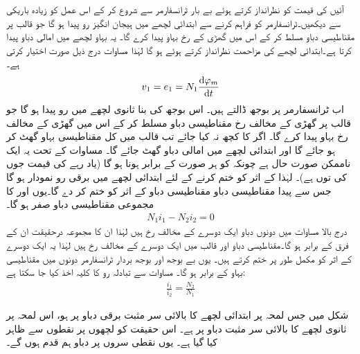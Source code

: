 آئیں  کی قیمت کو نظرانداز کرتے ہوئے بے بار ٹرانسفارمر سے شروع کر کے اس عمل کو زیادہ باریکی سے دیکھیں۔ٹرانسفارمر کو  فراہم کرنے سے ابتدائی لچھے میں ہیجان انگیز رو  پیدا ہو گا جو قالب پر  مقناطیسی دباو مسلط  کر کے اس میں گھڑی کے رخ بہاو  پیدا کرے گا۔ یہ بہاو  لچھے میں امالی دباو  پیدا کرتا ہے۔ابتدائی لچھے کی مزاحمت نظرانداز کرتے ہوئے  ہو گا  لہٰذا  مساوات  درج ذیل صورت اختیار کرتی ہے۔
\begin{align}\label{مساوات_ٹرانسفارمر_دباو_برابر_بہاو_تفرق_ب}
v_1=e_1=N_1 \frac{\dif \varphi_m}{\dif t}
\end{align}
اب ٹرانسفارمر پر  بوجھ ڈالتے ہیں۔ اس بوجھ کی بنا ثانوی لچھے میں  رو پیدا ہو گا جو قالب پر گھڑی کے مخالف رخ مقناطیسی دباو  مسلط کر کے اس میں گھڑی کے مخالف رخ بہاو  پیدا کرے گا۔ اگر  کا کچھ نہ کیا جائے تب  قالب میں کل مقناطیسی بہاو گھٹ کر  ہو جائے گا اور ابتدائی لچھے میں امالی دباو گھٹ جائے گا۔ مساوات  کے تحت یہ ایک ناممکن صورت حال ہے چونکہ  کو ہر صورت  کے برابر ہونا ہو گا (یاد رہے  کی قیمت جوں کی توں ہے)۔ لہٰذا   کے اثر کو ختم کرنے کے لئے ابتدائی لچھے میں برقی رو  نمودار ہو گا جس سے پیدا مقناطیسی دباو  مقناطیسی دباو   کے اثر کو ختم کر دے گا۔یوں  اور  کا مجموعی مقناطیسی دباو صفر ہو گا۔
\begin{align}\label{مساوات_ٹرانسفارمر_رو_تناسب}
N_1 i_1-N_2 i_2=0
\end{align}
درج بالا مساوات میں دونوں دباو  ایک دوسرے کے مخالف  رخ ہیں لہٰذا ان کا مجموعہ درحقیقت ان کے فرق کے برابر ہو گا۔مقناطیسی دباو  اور  قالب میں ایک دوسرے کے مخالف رخ ہیں لہٰذا یہ ایک دوسرے کے اثر کو مکمل طور پر ختم کرتے ہیں۔ یوں بے بوجھ اور بوجھ بردار ٹرانسفارمر دونوں میں  مقناطیسی بہاو   کے برابر  ہو گا۔ مساوات  سے تبادلہ رو کا کلیہ اخذ کیا جا سکتا ہے:
\begin{align}\label{مساوات_ٹرانسفارمر_برقی_رو_اور_چکر_شرح}
\frac{i_1}{i_2}=\frac{N_2}{N_1}
\end{align}
%

شکل   میں جس لمحہ پر ابتدائی لچھے کا بالائی سر مثبت برقی دباو پر ہو، اس لمحہ پر ثانوی لچھے کا بالائی سر مثبت دباو پر ہے۔ اس حقیقت کو لچھوں پر نقطوں سے ظاہر کیا گیا ہے۔ یوں نقطی سروں پر دباو ہم قدم ہوں گے۔

